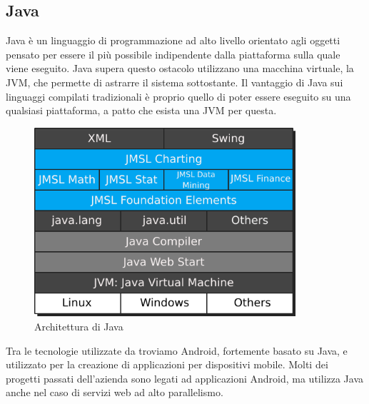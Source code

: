    \subsection{Java}
   Java è un linguaggio di programmazione ad alto livello orientato agli oggetti pensato per essere il più possibile indipendente dalla piattaforma sulla quale viene eseguito. Java supera questo ostacolo utilizzano una macchina virtuale, la JVM, che permette di astrarre il sistema sottostante. Il vantaggio di Java sui linguaggi compilati tradizionali è proprio quello di poter essere eseguito su una qualsiasi piattaforma, a patto che esista una JVM per questa.
   \begin{figure}[H]
      \begin{center}
         \includegraphics[height=7cm,keepaspectratio]{immagini/java-architecture}
      \end{center}
      \caption{Architettura di Java}
   \end{figure}
   Tra le tecnologie utilizzate da \nomeAzienda{} troviamo Android, fortemente basato su Java, e utilizzato per la creazione di applicazioni per dispositivi mobile. Molti dei progetti passati dell'azienda sono legati ad applicazioni Android, ma \nomeAzienda{} utilizza Java anche nel caso di servizi web ad alto parallelismo.
